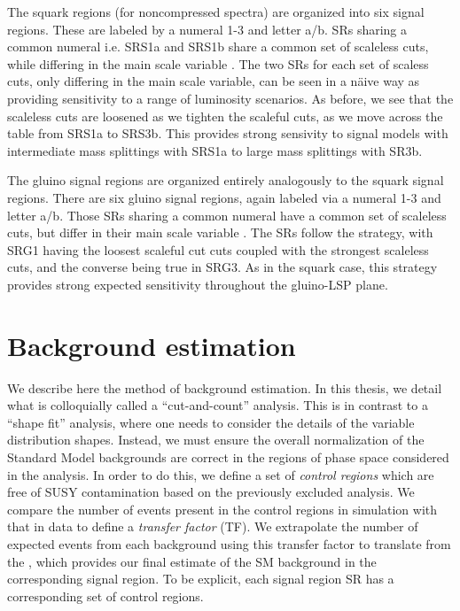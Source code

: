The squark regions (for noncompressed spectra) are organized into six signal regions.
These are labeled by a numeral 1-3 and letter a/b.
SRs sharing a common numeral i.e. SRS1a and SRS1b share a common set of scaleless cuts, while differing in the main scale variable .
The two SRs for each set of scaless cuts, only differing in the main scale variable, can be seen in a n{\"a}ive way as providing sensitivity to a range of luminosity scenarios\footnotemark.
As before, we see that the scaleless cuts are loosened as we tighten the scaleful cuts, as we move across the table from SRS1a to SRS3b.
This provides strong sensivity to signal models with intermediate mass splittings with SRS1a to large mass splittings with SR3b.

The gluino signal regions are organized entirely analogously to the squark signal regions.
There are six gluino signal regions, again labeled via a numeral 1-3 and letter a/b.
Those SRs sharing a common numeral have a common set of scaleless cuts, but differ in their main scale variable .
The SRs follow the strategy, with SRG1 having the loosest scaleful cut cuts coupled with the strongest scaleless cuts, and the converse being true in SRG3.
As in the squark case, this strategy provides strong expected sensitivity throughout the gluino-LSP plane.



\section{Background estimation}

We describe here the method of background estimation.
In this thesis, we detail what is colloquially called a ``cut-and-count'' analysis.
This is in contrast to a ``shape fit'' analysis, where one needs to consider the details of the variable distribution shapes.
Instead, we must ensure the overall normalization of the Standard Model backgrounds are correct in the regions of phase space considered in the analysis.
In order to do this, we define a set of \textit{control regions} which are free of SUSY contamination based on the previously excluded analysis.
We compare the number of events present in the control regions in simulation with that in data to define a \textit{transfer factor} (TF).
We extrapolate the number of expected events from each background using this transfer factor to translate from the , which provides our final estimate of the SM background in the corresponding signal region.
To be explicit, each signal region SR has a corresponding set of control regions.

